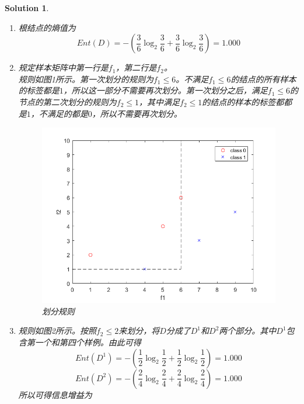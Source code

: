 \documentclass[a4paper,UTF8]{article}
\numberwithin{equation}{section}
\newtheorem*{solution}{Solution}
\begin{document}
 \begin{solution}
 ~\\
 \begin{enumerate}
 \item [(1)]
 根结点的熵值为
 \begin{equation}
 Ent(D) = -(\frac{3}{6}\log_2\frac{3}{6} + \frac{3}{6}\log_2\frac{3}{6}) = 1.000
 \end{equation}
 \item [(2)]
 规定样本矩阵中第一行是$f_1$，第二行是$f_2$。\\
 规则如图1所示。第一次划分的规则为$f_1\leq 6$。不满足$f_1\leq 6$的结点的所有样本的标签都是$1$，所以这一部分不需要再次划分。第一次划分之后，满足$f_1\leq 6$的节点的第二次划分的规则为$f_2\leq 1$，其中满足$f_2\leq 1$的结点的样本的标签都都是$1$，不满足的都是$0$，所以不需要再次划分。
 \begin{figure}[!h]
 	\centering   
 	\includegraphics[scale=0.4]{coordinate1.png}  
 	\caption{划分规则} 
 	\label{coordinate1}
 \end{figure}
 \item [(3)]
 规则如图2所示。按照$f_2\leq 2$来划分，将$D$分成了$D^1$和$D^2$两个部分。其中$D^1$包含第一个和第四个样例。由此可得
 \begin{equation}
 Ent(D^1) =  -(\frac{1}{2}\log_2\frac{1}{2} + \frac{1}{2}\log_2\frac{1}{2}) = 1.000
 \end{equation}
 \begin{equation}
 Ent(D^2) = -(\frac{2}{4}\log_2\frac{2}{4} + \frac{2}{4}\log_2\frac{2}{4}) = 1.000
 \end{equation}
 所以可得信息增益为
 \begin{equation}

\end{equation}
\end{enumerate}
\end{solution}
\end{document}
